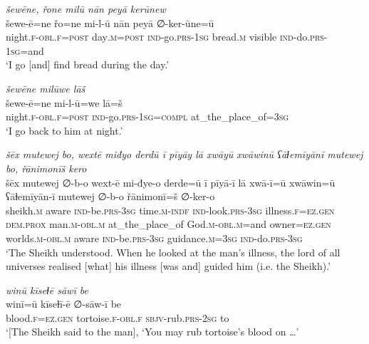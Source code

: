 \ea \label{DG.40}
\textit{šewēne, řone milū nān peyā kerūnew} \\ 
\gll šewe-ē=ne řo=ne mi-l-ū nān peyā ∅-ker-ūne=ū \\ 
 night\textsc{\textsc{.f}}\textsc{-obl}\textsc{\textsc{.f}}\textsc{=\textsc{post}} day\textsc{.m}\textsc{=\textsc{post}} \textsc{ind-}go\textsc{.prs}\textsc{-1sg} bread\textsc{.m} visible \textsc{ind-}do\textsc{.prs}\textsc{-1sg}=and \\ 
\glt `I go [and] find bread during the day.'
\z 
 
\ea \label{DG.41}
\textit{šewēne milūwe lāš} \\ 
\gll šewe-ē=ne mi-l-ū=we lā=š \\ 
 night\textsc{\textsc{.f}}\textsc{-obl}\textsc{\textsc{.f}}\textsc{=\textsc{post}} \textsc{ind-}go\textsc{.prs}\textsc{-1sg}\textsc{=compl} at\_the\_place\_of\textsc{=3sg} \\ 
\glt `I go back to him at night.'
\z 
 
\ea \label{DG.46}
\textit{šēx mutewej bo, wextē miđyo derdū ī pīyāy lā xwāyū xwāwinū ʕāɫemīyānī mutewej bo, řānimonīš kero} \\ 
\gll šēx mutewej ∅-b-o wext-ē mi-đye-o derde=ū ī pīyā-ī lā xwā-ī=ū xwāwin=ū ʕāɫemīyān-ī mutewej ∅-b-o řānimonī=š ∅-ker-o \\ 
 sheikh\textsc{.m} aware \textsc{ind-}be\textsc{.prs}\textsc{-3sg} time\textsc{.m}\textsc{-indf} \textsc{ind-}look\textsc{.prs}\textsc{-3sg} illness\textsc{\textsc{.f}}\textsc{=ez}\textsc{.gen} \textsc{dem.prox} man\textsc{.m}\textsc{-obl}\textsc{.m} at\_the\_place\_of God\textsc{.m}\textsc{-obl}\textsc{.m}=and owner\textsc{=ez}\textsc{.gen} worlds\textsc{.m}\textsc{-obl}\textsc{.m} aware \textsc{ind-}be\textsc{.prs}\textsc{-3sg} guidance\textsc{.m}\textsc{=3sg} \textsc{ind-}do\textsc{.prs}\textsc{-3sg} \\ 
\glt `The Sheikh understood. When he looked at the man’s illness, the lord of all universes realised [what] his illness [was and] guided him (i.e. the Sheikh).'
\z 
 
\ea \label{DG.47}
\textit{winū kīseɫē sāwī be} \\ 
\gll winī=ū kīseɫī-ē ∅-sāw-ī be \\ 
 blood\textsc{\textsc{.f}}\textsc{=ez}\textsc{.gen} tortoise\textsc{\textsc{.f}}\textsc{-obl}\textsc{\textsc{.f}} \textsc{sbjv-}rub\textsc{.prs}-\textsc{2sg} to \\ 
\glt `[The Sheikh said to the man], ‘You may rub tortoise’s blood on …'
\z 
 
